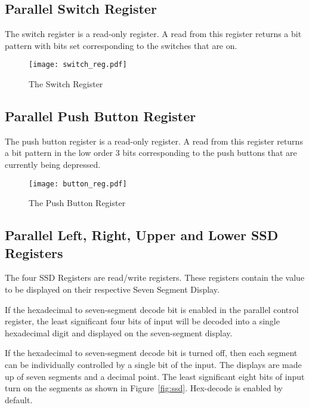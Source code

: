 \subsection{Parallel Switch Register}

The switch register is a read-only register. A read from this register
returns a bit pattern with bits set corresponding to the switches that
are on.

\begin{figure}[h]
\begin{center}
\texttt{[image: switch\_reg.pdf]}
\caption{The Switch Register}
\label{switch_reg_pic}
\end{center}
\end{figure}


\subsection{Parallel Push Button Register}

The push button register is a read-only register. A read from this
register returns a bit pattern in the low order 3 bits corresponding
to the push buttons that are currently being depressed.

\begin{figure}[h]
\begin{center}
\texttt{[image: button\_reg.pdf]}
\caption{The Push Button Register}
\label{button_reg_pic}
\end{center}
\end{figure}

\subsection{Parallel Left, Right, Upper and Lower SSD Registers}

The four SSD Registers are read/write registers. These
registers contain the value to be displayed on their respective Seven
Segment Display. 

If the hexadecimal to seven-segment decode bit is enabled in the
parallel control register, the least significant four bits of input
will be decoded into a single hexadecimal digit and displayed on the
seven-segment display.

If the hexadecimal to seven-segment decode bit is turned off, then
each segment can be individually controlled by a single bit of the
input. The displays are made up of seven segments and a decimal point.
The least significant eight bits of input turn on the segments as
shown in Figure~\ref{fig:ssd}.
Hex-decode is enabled by default.

